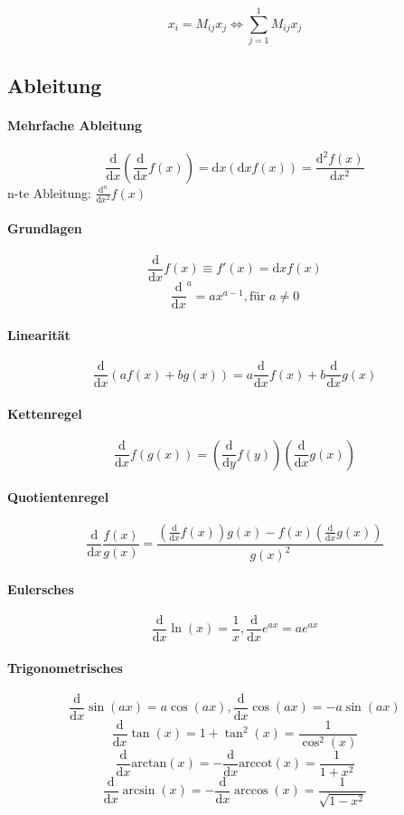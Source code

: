 \documentclass[oneside]{book}
\theoremstyle{definition}
\renewcommand{\d}{\mathrm d}
\newcommand{\dd}[1]{\frac{\d}{\d #1}}
\begin{document}
$$x_i = M_{ij} x_j \Leftrightarrow \sum_{j=1}^1 M_{ij} x_j$$

\subsection{Ableitung}

\paragraph{Mehrfache Ableitung}
$$\dd x (\dd x f(x)) = \d x (\d x f(x)) = \frac{\d^2 f(x)}{\d x^2}$$
n-te Ableitung: $\frac{\d^n}{\d x^2} f(x)$

\paragraph{Grundlagen}
$$\dd x f(x) \equiv f'(x) = \d x f(x)$$
$$\dd x^a = a x^{a-1}, \text{für $a \neq 0$}$$

\paragraph{Linearität}
$$\dd x (a f(x) + b g(x)) = a \dd x f(x) + b \dd x g(x)$$

\paragraph{Kettenregel}
$$\dd x f(g(x)) = (\dd y f(y))(\dd x g(x))$$

\paragraph{Quotientenregel}
$$\dd x \frac{f(x)}{g(x)} = \frac{(\dd x f(x))g(x) - f(x)(\dd x g(x))}{g(x)^2}$$

\paragraph{Eulersches}
$$\dd x \ln(x) = \frac1x, \dd x e^{ax} = a e^{ax}$$

\paragraph{Trigonometrisches}
$$\dd x \sin(ax) = a \cos(ax), \dd x \cos(ax) = - a \sin(ax)$$
$$\dd x \tan(x) = 1 + \tan^2(x) = \frac1{\cos^2(x)}$$
$$\dd x \mathrm{arctan}(x) = - \dd x \mathrm{arccot}(x) = \frac{1}{1 + x^2}$$
$$\dd x \arcsin(x) = - \dd x \arccos(x) = \frac1{\sqrt{1 - x^2}}$$
\end{document}
